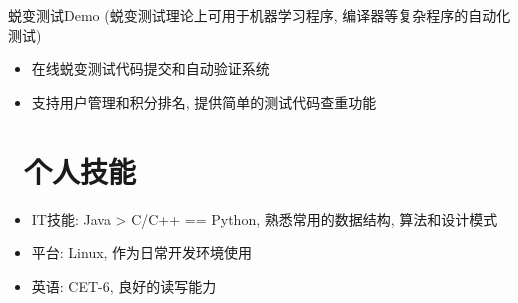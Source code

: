 \documentclass{resume}
\begin{document}
蜕变测试Demo (蜕变测试理论上可用于机器学习程序, 编译器等复杂程序的自动化测试)
\begin{itemize}
  \item 在线蜕变测试代码提交和自动验证系统
  \item 支持用户管理和积分排名, 提供简单的测试代码查重功能
\end{itemize}

\section{\faCogs\ 个人技能}
\begin{itemize}[parsep=0.5ex]
  \item IT技能: Java > C/C++ == Python, 熟悉常用的数据结构, 算法和设计模式
  \item 平台: Linux, 作为日常开发环境使用
  \item 英语: CET-6, 良好的读写能力
\end{itemize}

% 


\end{document}
